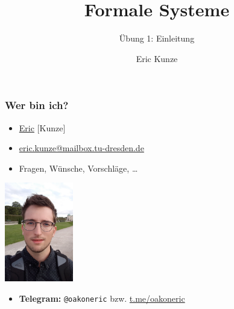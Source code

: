 \documentclass{beamer}
\begin{document}
	
	\title{Formale Systeme}
	\subtitle{Übung 1: Einleitung}
	\author{Eric Kunze}
	\date{}

	\maketitle
	
	\begin{frame} \frametitle{Wer bin ich?}
		\begin{minipage}{\dimexpr0.75\linewidth-\fboxrule-\fboxsep}
			\begin{itemize}
				\item \uline{Eric} [Kunze]
				\item \url{eric.kunze@mailbox.tu-dresden.de}
				\item Fragen, Wünsche, Vorschläge, \dots 
			\end{itemize}
		\end{minipage}
		\begin{minipage}{\dimexpr0.25\linewidth-\fboxrule-\fboxsep}
			\includegraphics[width=3cm]{./tut01_pic.jpg}
		\end{minipage}		
		
		\begin{itemize}
			\item \textbf{Telegram:} \texttt{@oakoneric} bzw. \url{t.me/oakoneric}
		\end{itemize}
	\end{frame}
\end{document}
